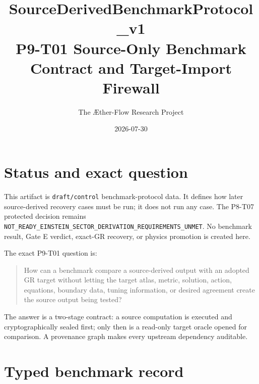 \documentclass[11pt]{article}
\title{SourceDerivedBenchmarkProtocol\_v1\\
P9-T01 Source-Only Benchmark Contract and Target-Import Firewall}
\author{The \AE ther-Flow Research Project}
\date{2026-07-30}
\begin{document}
\sloppy
\maketitle

\section{Status and exact question}

This artifact is \texttt{draft/control} benchmark-protocol data.  It defines
how later source-derived recovery cases must be run; it does not run any case.
The P8-T07 protected decision remains
\texttt{NOT\_READY\_EINSTEIN\_SECTOR\_DERIVATION\_REQUIREMENTS\_UNMET}.
No benchmark result, Gate E verdict, exact-GR recovery, or physics promotion is
created here.

The exact P9-T01 question is:
\begin{quote}
How can a benchmark compare a source-derived output with an adopted GR target
without letting the target atlas, metric, solution, action, equations,
boundary data, tuning information, or desired agreement create the source
output being tested?
\end{quote}

The answer is a two-stage contract: a source computation is executed and
cryptographically sealed first; only then is a read-only target oracle opened
for comparison.  A provenance graph makes every upstream dependency auditable.

\section{Typed benchmark record}
\end{document}
